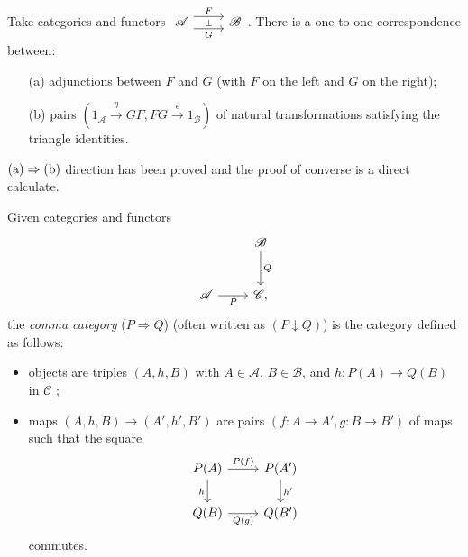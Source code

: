 \begin{theorem}
  Take categories and functors $
  \begin{tikzcd}\mathscr{A}\arrow[r, shift left=2, "F"]  \arrow[r, shift right=2,"\bot", "G"'] &\mathscr{B}
  \end{tikzcd}$. There is a one-to-one correspondence between:
  \begin{enumerate}
    \item[\rm{(a)}] adjunctions between $F$ and $G$ (with $F$ on the left and $G$ on the right);
    \item[\rm{(b)}] pairs $\left( 1_{\mathscr{A}}\xrightarrow{\eta}GF,FG\xrightarrow{\epsilon }1_{\mathscr{B}} \right)$ of natural transformations satisfying the triangle identities.
  \end{enumerate}
\end{theorem}
$(\rm{a})\Rightarrow (\rm{b})$ direction has been proved and the proof of converse is a direct calculate.
\begin{definition}
  Given categories and functors
  \[
    \begin{tikzcd}[row sep=large]
    & \mathscr{B}\arrow[d,"Q"] \\
    \mathscr{A} \arrow[r,"P"'] & \mathscr{C},
  \end{tikzcd}
  \] 
  the \textit{comma category} ($P\Rightarrow Q$) (often written as $(P\downarrow Q)$) is the category defined as follows:
  \begin{itemize}
    \item objects are triples $(A,h,B)$ with $A\in \mathscr{A}$, $B\in \mathscr{B}$, and $h:P(A)\to Q(B)$ in $\mathscr{C}$ ;
    \item maps $\left( A,h,B \right) \to (A',h',B')$ are pairs $\left( f:A\to A',g:B\to B' \right) $ of maps such that the square
      \[
      \begin{tikzcd}
	P(A)\arrow[r,"P(f)"]\arrow[d,"h"']  &P(A')\arrow[d,"h'"] \\
	Q(B)\arrow[r,"Q(g)"'] & Q(B')
      \end{tikzcd}
      \]
      commutes.
  \end{itemize}
\end{definition}

